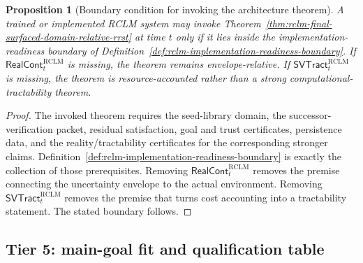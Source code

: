 \documentclass[11pt,a4paper]{article}
\newtheorem{proposition}[theorem]{Proposition}
\newcommand{\RCLM}{\mathrm{RCLM}}
\begin{document}
\begin{proposition}[Boundary condition for invoking the architecture theorem]
\label{prop:rclm-invocation-boundary}
A trained or implemented RCLM system may invoke Theorem~\ref{thm:rclm-final-surfaced-domain-relative-rrst} at time \(t\) only if it lies inside the implementation-readiness boundary of Definition~\ref{def:rclm-implementation-readiness-boundary}.  If \(\mathsf{RealCont}_t^{\RCLM}\) is missing, the theorem remains envelope-relative.  If \(\mathsf{SVTract}_t^{\RCLM}\) is missing, the theorem is resource-accounted rather than a strong computational-tractability theorem.
\end{proposition}

\begin{proof}
The invoked theorem requires the seed-library domain, the successor-verification packet, residual satisfaction, goal and trust certificates, persistence data, and the reality/tractability certificates for the corresponding stronger claims.  Definition~\ref{def:rclm-implementation-readiness-boundary} is exactly the collection of those prerequisites.  Removing \(\mathsf{RealCont}_t^{\RCLM}\) removes the premise connecting the uncertainty envelope to the actual environment.  Removing \(\mathsf{SVTract}_t^{\RCLM}\) removes the premise that turns cost accounting into a tractability statement.  The stated boundary follows.
\end{proof}

\subsection{Tier 5: main-goal fit and qualification table}
\end{document}
